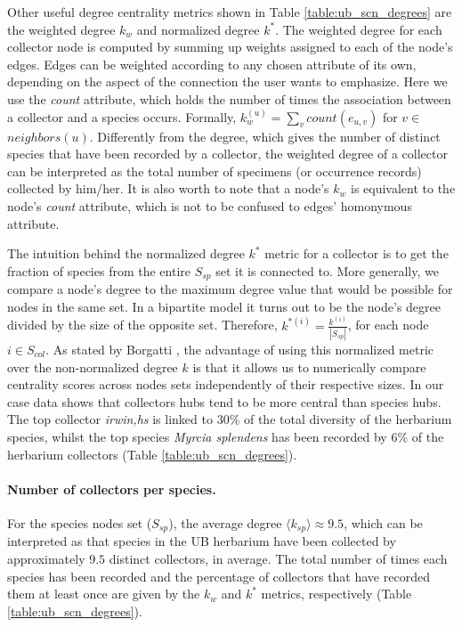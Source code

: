 Other useful degree centrality metrics shown in Table \ref{table:ub_scn_degrees} are the weighted degree $k_w$ and normalized degree $k^*$. The weighted degree for each collector node is computed by summing up weights assigned to each of the node's edges. Edges can be weighted according to any chosen attribute of its own, depending on the aspect of the connection the user wants to emphasize. Here we use the \textit{count} attribute, which holds the number of times the association between a collector and a species occurs. Formally, $k_w^{(u)} = \sum_{v} count(e_{u,v})$ for $v \in$ $neighbors(u)$. Differently from the degree, which gives the number of distinct species that have been recorded by a collector, the weighted degree of a collector can be interpreted as the total number of specimens (or occurrence records) collected by him/her. It is also worth to note that a node's $k_w$ is equivalent to the node's \textit{count} attribute, which is not to be confused to edges' homonymous attribute.

The intuition behind the normalized degree $k^*$ metric for a collector is to get the fraction of species from the entire $S_{sp}$ set it is connected to. More generally, we compare a node's degree to the maximum degree value that would be possible for nodes in the same set. In a bipartite model it turns out to be the node's degree divided by the size of the opposite set. Therefore, $k^{*(i)} = \frac{k^{(i)}}{|S_{sp}|}$, for each node $i \in S_{col}$. 
As stated by Borgatti \cite{Borgatti2015}, the advantage of using this normalized metric over the non-normalized degree $k$ is that it allows us to numerically compare centrality scores across nodes sets independently of their respective sizes. 
In our case data shows that collectors hubs tend to be more central than species hubs. The top collector \textit{irwin,hs} is linked to $30\%$ of the total diversity of the herbarium species, whilst the top species \textit{Myrcia splendens} has been recorded by $6\%$ of the herbarium collectors (Table \ref{table:ub_scn_degrees}). 



\paragraph*{Number of collectors per species.}
For the species nodes set ($S_{sp}$), the average degree $\langle k_{sp}\rangle \approx 9.5$, which can be interpreted as that species in the UB herbarium have been collected by approximately $9.5$ distinct collectors, in average. 
The total number of times each species has been recorded and the percentage of collectors that have recorded them at least once are given by the $k_w$ and $k^*$ metrics, respectively (Table \ref{table:ub_scn_degrees}).

